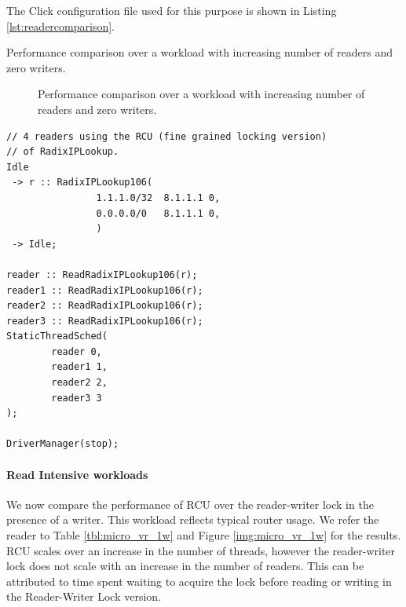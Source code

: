 \documentclass[a4paper,marginparwidth=50pt,marginparsep=10pt]{article}
\begin{document}
The Click configuration file used for this purpose is shown in Listing \ref{lst:readercomparison}.
\begin{table}
\begin{center}

\end{center}
\label{tbl:micro_vr_0w}
\caption{Performance comparison over a workload with increasing number of readers and zero writers.}
\end{table}

\begin{figure}[tph]
\caption{Performance comparison over a workload with increasing number of readers and zero writers.}
\label{img:micro_vr_0w}
\end{figure}

\begin{lstlisting}[float=tph, caption = A Click configuration file for 4 readers, label =lst:readercomparison]
// 4 readers using the RCU (fine grained locking version)
// of RadixIPLookup.
Idle
 -> r :: RadixIPLookup106(
                1.1.1.0/32  8.1.1.1 0,
                0.0.0.0/0   8.1.1.1 0,
                ) 
 -> Idle;

reader :: ReadRadixIPLookup106(r);
reader1 :: ReadRadixIPLookup106(r);
reader2 :: ReadRadixIPLookup106(r);
reader3 :: ReadRadixIPLookup106(r);
StaticThreadSched(
        reader 0,
        reader1 1,
        reader2 2,
        reader3 3
);

DriverManager(stop);

\end{lstlisting}

\paragraph{Read Intensive workloads}
We now compare the performance of RCU over the reader-writer lock in the presence of a writer. This workload reflects typical router usage. We refer the reader to Table \ref{tbl:micro_vr_1w} and Figure \ref{img:micro_vr_1w} for the results.
RCU scales over an increase in the number of threads, however the reader-writer lock does not scale with an increase in the number of readers. This can be attributed to time spent waiting to acquire the lock before reading or writing in the Reader-Writer Lock version.
\end{document}
